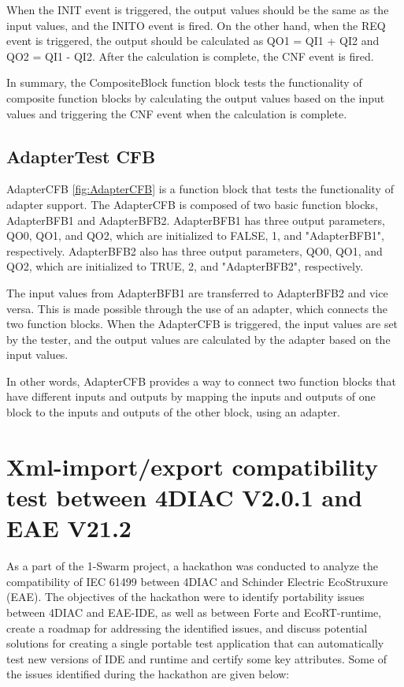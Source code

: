 \begin{bibunit}
When the INIT event is triggered, the output values should be the same as the input values, and the INITO event is fired. On the other hand, when the REQ event is triggered, the output should be calculated as QO1 = QI1 + QI2 and QO2 = QI1 - QI2. After the calculation is complete, the CNF event is fired.

In summary, the CompositeBlock function block tests the functionality of composite function blocks by calculating the output values based on the input values and triggering the CNF event when the calculation is complete.

\subsection{AdapterTest CFB}


AdapterCFB \ref{fig:AdapterCFB} is a function block that tests the functionality of adapter support. The AdapterCFB is composed of two basic function blocks, AdapterBFB1 and AdapterBFB2. AdapterBFB1 has three output parameters, QO0, QO1, and QO2, which are initialized to FALSE, 1, and "AdapterBFB1", respectively. AdapterBFB2 also has three output parameters, QO0, QO1, and QO2, which are initialized to TRUE, 2, and "AdapterBFB2", respectively.

The input values from AdapterBFB1 are transferred to AdapterBFB2 and vice versa. This is made possible through the use of an adapter, which connects the two function blocks. When the AdapterCFB is triggered, the input values are set by the tester, and the output values are calculated by the adapter based on the input values.

In other words, AdapterCFB provides a way to connect two function blocks that have different inputs and outputs by mapping the inputs and outputs of one block to the inputs and outputs of the other block, using an adapter.

\section{Xml-import/export compatibility test
between 4DIAC  V2.0.1 and EAE 
V21.2}

As a part of the 1-Swarm project, a hackathon was conducted to analyze the compatibility of IEC 61499 between 4DIAC and Schinder Electric EcoStruxure (EAE). The objectives of the hackathon were to identify portability issues between 4DIAC and EAE-IDE, as well as between Forte and EcoRT-runtime, create a roadmap for addressing the identified issues, and discuss potential solutions for creating a single portable test application that can automatically test new versions of IDE and runtime and certify some key attributes. Some of the issues identified during the hackathon are given below: 


\end{bibunit}
